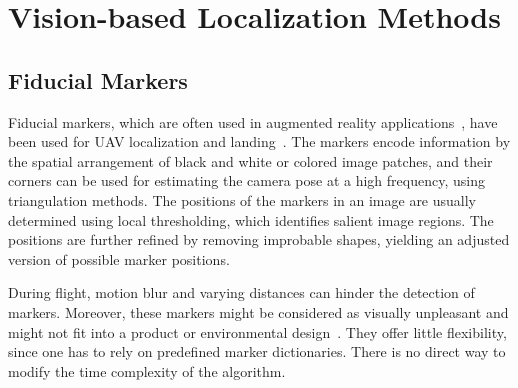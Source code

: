 \section{Vision-based Localization Methods}

\subsection{Fiducial Markers}
\label{sec:fiducialmarkers}

Fiducial markers, which are often used in augmented reality
applications~\cite{kato1999marker,garrido2014automatic}, have been
used for UAV localization and
landing~\cite{eberli2011vision,bebop2015}.
The markers encode information by the spatial arrangement of
black and white or colored image patches, and their corners can be
used for estimating the camera pose at a high frequency, using
triangulation methods. The positions of the markers in
an image are usually determined using local thresholding, which identifies salient image
regions. The positions are further refined by removing improbable shapes,
yielding an adjusted version of possible marker positions.

During flight, motion blur and varying distances can hinder the
detection of markers. Moreover, these markers might be considered as
visually unpleasant and might not fit into a product or environmental
design~\cite{chu2013halftone}. They offer little
flexibility, since one has to rely on predefined marker dictionaries.
There is no direct way to modify the time complexity of the algorithm.

